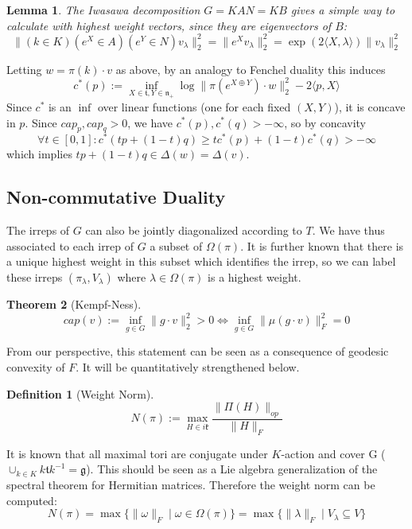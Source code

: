 \documentclass{article}
\newtheorem{theorem}{Theorem}
\newtheorem{lemma}[theorem]{Lemma}
\newtheorem{definition}{Definition}
\begin{document}
\begin{lemma}
The Iwasawa decomposition $G = KAN = K B$ gives a simple way to calculate with highest weight vectors, since they are eigenvectors of $B$:
\[ \|(k \in K) (e^{X} \in A) (e^{Y} \in N) v_{\lambda}\|_{2}^{2} = \|e^{X} v_{\lambda}\|_{2}^{2} = \exp(2 \langle X, \lambda \rangle) \|v_{\lambda}\|_{2}^{2}  \]
\end{lemma}

Letting $w = \pi(k) \cdot v$ as above, by an analogy to Fenchel duality this induces 
\[ c^{*}(p) := \inf_{X \in \mathfrak{t},Y \in \mathfrak{n}_{+}} \log \|\pi(e^{X \oplus Y}) \cdot w\|_{2}^{2} - 2 \langle p, X \rangle  \]
Since $c^{*}$ is an $\inf$ over linear functions (one for each fixed $(X,Y)$), it is concave in $p$. Since $cap_{p},cap_{q} > 0$, we have $c^{*}(p),c^{*}(q) > -\infty$, so by concavity 
\[ \forall t \in [0,1]: c^{*}(tp + (1-t)q) \geq t c^{*}(p) + (1-t) c^{*}(q) > -\infty \]
which implies $tp + (1-t)q \in \Delta(w) = \Delta(v)$. 

\subsection{Non-commutative Duality}
The irreps of $G$ can also be jointly diagonalized according to $T$. We have thus associated to each irrep of $G$ a subset of $\Omega(\pi)$. It is further known that there is a unique highest weight in this subset which identifies the irrep, so we can label these irreps $(\pi_{\lambda},V_{\lambda})$ where $\lambda \in \Omega(\pi)$ is a highest weight. 

\begin{theorem} [Kempf-Ness]
\[ cap(v) := \inf_{g \in G} \|g \cdot v\|_{2}^{2} > 0 
 \iff \inf_{g \in G} \|\mu(g \cdot v)\|_{F}^{2} = 0 \]
\end{theorem}
From our perspective, this statement can be seen as a consequence of geodesic convexity of $F$. It will be quantitatively strengthened below. 

\begin{definition} [Weight Norm]
\[ N(\pi) := \max_{H \in i \mathfrak{k}} \frac{\|\Pi(H)\|_{op}}{\|H\|_{F}}   \]
\end{definition}
It is known that all maximal tori are conjugate under $K$-action and cover G ($\cup_{k \in K} k \mathfrak{t} k^{-1} = \mathfrak{g}$). This should be seen as a Lie algebra generalization of the spectral theorem for Hermitian matrices. Therefore the weight norm can be computed:
\[ N(\pi) = \max \{ \|\omega\|_{F} \mid \omega \in \Omega(\pi) \} = \max \{ \|\lambda\|_{F} \mid V_{\lambda} \subseteq V \}   \]
\end{document}
